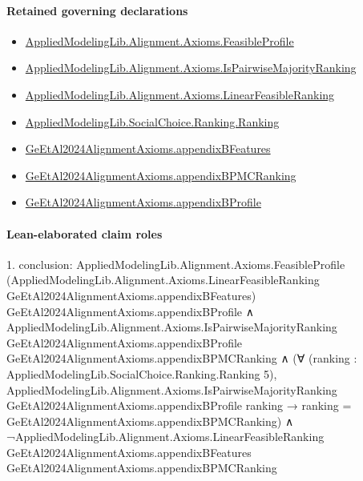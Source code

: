 \documentclass[10pt]{article}
\begin{document}
\paragraph{Retained governing declarations}
\begin{itemize}\raggedright
\item \hyperlink{library-prerequisite-5fa7bdb49b050adf}{Applied\allowbreak{}Modeling\allowbreak{}Lib.\allowbreak{}Alignment.\allowbreak{}Axioms.\allowbreak{}Feasible\allowbreak{}Profile}
\item \hyperlink{governing-declaration-1d952514f8013a9b}{Applied\allowbreak{}Modeling\allowbreak{}Lib.\allowbreak{}Alignment.\allowbreak{}Axioms.\allowbreak{}Is\allowbreak{}Pairwise\allowbreak{}Majority\allowbreak{}Ranking}
\item \hyperlink{library-prerequisite-3c30aae25bef2671}{Applied\allowbreak{}Modeling\allowbreak{}Lib.\allowbreak{}Alignment.\allowbreak{}Axioms.\allowbreak{}Linear\allowbreak{}Feasible\allowbreak{}Ranking}
\item \hyperlink{library-prerequisite-5cde54446d1ae021}{Applied\allowbreak{}Modeling\allowbreak{}Lib.\allowbreak{}Social\allowbreak{}Choice.\allowbreak{}Ranking.\allowbreak{}Ranking}
\item \hyperlink{governing-declaration-575359b4c599187c}{Ge\allowbreak{}Et\allowbreak{}Al2024\allowbreak{}Alignment\allowbreak{}Axioms.\allowbreak{}appendix\allowbreak{}B\allowbreak{}Features}
\item \hyperlink{governing-declaration-9684e86b4bb43e25}{Ge\allowbreak{}Et\allowbreak{}Al2024\allowbreak{}Alignment\allowbreak{}Axioms.\allowbreak{}appendix\allowbreak{}BPMC\allowbreak{}Ranking}
\item \hyperlink{governing-declaration-ed2f0484764b0e28}{Ge\allowbreak{}Et\allowbreak{}Al2024\allowbreak{}Alignment\allowbreak{}Axioms.\allowbreak{}appendix\allowbreak{}B\allowbreak{}Profile}
\end{itemize}
\paragraph{Lean-elaborated claim roles}\begin{ReviewVerbatim}
1. conclusion: AppliedModelingLib.Alignment.Axioms.FeasibleProfile
    (AppliedModelingLib.Alignment.Axioms.LinearFeasibleRanking GeEtAl2024AlignmentAxioms.appendixBFeatures)
    GeEtAl2024AlignmentAxioms.appendixBProfile ∧
  AppliedModelingLib.Alignment.Axioms.IsPairwiseMajorityRanking GeEtAl2024AlignmentAxioms.appendixBProfile
      GeEtAl2024AlignmentAxioms.appendixBPMCRanking ∧
    (∀ (ranking : AppliedModelingLib.SocialChoice.Ranking.Ranking 5),
        AppliedModelingLib.Alignment.Axioms.IsPairwiseMajorityRanking GeEtAl2024AlignmentAxioms.appendixBProfile
            ranking →
          ranking = GeEtAl2024AlignmentAxioms.appendixBPMCRanking) ∧
      ¬AppliedModelingLib.Alignment.Axioms.LinearFeasibleRanking GeEtAl2024AlignmentAxioms.appendixBFeatures
          GeEtAl2024AlignmentAxioms.appendixBPMCRanking
\end{ReviewVerbatim}
\end{document}
